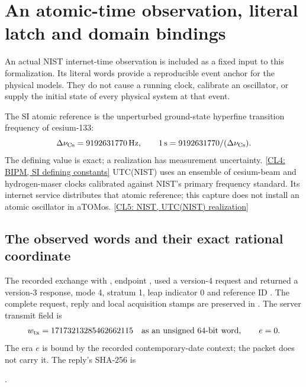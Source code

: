 \section{An atomic-time observation, literal latch and domain bindings}
\label{sec:r14-clock-binding}
An actual NIST internet-time observation is included as a fixed input to this
formalization. Its literal words provide a reproducible event anchor for the
physical models. They do not cause a running clock, calibrate an oscillator,
or supply the initial state of every physical system at that event.

The SI atomic reference is the unperturbed ground-state hyperfine transition
frequency of cesium-133:
\begin{equation}
 \Delta\nu_{\rm Cs}=9192631770\,\mathrm{Hz},\qquad
 1\,\mathrm{s}=9192631770/(\Delta\nu_{\rm Cs}) .
 \label{eq:r14-atomic-reference}
\end{equation}
The defining value is exact; a realization has measurement uncertainty.
\href{https://www.bipm.org/en/measurement-units/si-defining-constants}{[CL4: BIPM, SI defining constants]}
UTC(NIST) uses an ensemble of cesium-beam and hydrogen-maser clocks calibrated
against NIST's primary frequency standard. Its internet service distributes
that atomic reference; this capture does not install an atomic oscillator
in aTOMos.
\href{https://www.nist.gov/pml/time-and-frequency-division/how-utcnist-related-coordinated-universal-time-utc-international}{[CL5: NIST, UTC(NIST) realization]}

\subsection{The observed words and their exact rational coordinate}
The recorded exchange with , endpoint
, used a version-4 request and returned a version-3
response, mode 4, stratum 1, leap indicator 0 and reference ID .
The complete request, reply and local acquisition stamps are preserved in
. The server transmit field is
\begin{equation}
 w_{\rm tx}=17173213285462662115
 \quad\text{as an unsigned 64-bit word},\qquad e=0.
 \label{eq:r14-observed-ntp}
\end{equation}
The era $e$ is bound by the recorded contemporary-date context; the packet
does not carry it. The reply's SHA-256 is
\begin{center}\small
{}.
\end{center}

